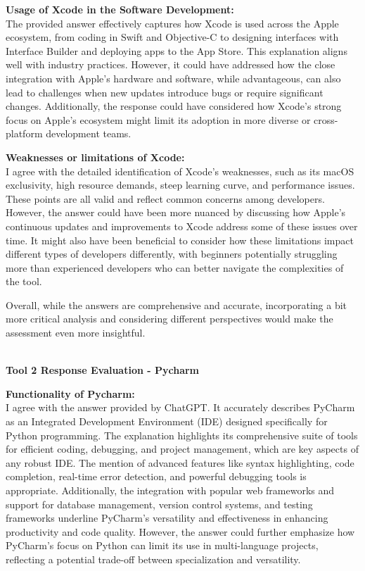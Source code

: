 \documentclass[a4paper, 11pt]{report}
\begin{document}
\textbf{Usage of Xcode in the Software Development:} \\
\noindent The provided answer effectively captures how Xcode is used across the Apple ecosystem, from coding in Swift and Objective-C to designing interfaces with Interface Builder and deploying apps to the App Store. This explanation aligns well with industry practices. However, it could have addressed how the close integration with Apple's hardware and software, while advantageous, can also lead to challenges when new updates introduce bugs or require significant changes.\cite{ohland2016xcode} Additionally, the response could have considered how Xcode's strong focus on Apple's ecosystem might limit its adoption in more diverse or cross-platform development teams.

\textbf{Weaknesses or limitations of Xcode:} \\
\noindent I agree with the detailed identification of Xcode's weaknesses, such as its macOS exclusivity, high resource demands, steep learning curve, and performance issues.\cite{lin2022xcode} These points are all valid and reflect common concerns among developers. However, the answer could have been more nuanced by discussing how Apple's continuous updates and improvements to Xcode address some of these issues over time. It might also have been beneficial to consider how these limitations impact different types of developers differently, with beginners potentially struggling more than experienced developers who can better navigate the complexities of the tool.

Overall, while the answers are comprehensive and accurate, incorporating a bit more critical analysis and considering different perspectives would make the assessment even more insightful.

\vspace{\baselineskip}\\
\noindent \textbf{\large{Tool 2 Response Evaluation - Pycharm}}

\textbf{Functionality of Pycharm:} \\
\noindent I agree with the answer provided by ChatGPT. It accurately describes PyCharm as an Integrated Development Environment (IDE) designed specifically for Python programming. The explanation highlights its comprehensive suite of tools for efficient coding, debugging, and project management, which are key aspects of any robust IDE.\cite{hu2018deepgraph} The mention of advanced features like syntax highlighting, code completion, real-time error detection, and powerful debugging tools is appropriate. Additionally, the integration with popular web frameworks and support for database management, version control systems, and testing frameworks underline PyCharm’s versatility and effectiveness in enhancing productivity and code quality. However, the answer could further emphasize how PyCharm's focus on Python can limit its use in multi-language projects, reflecting a potential trade-off between specialization and versatility.
\end{document}
